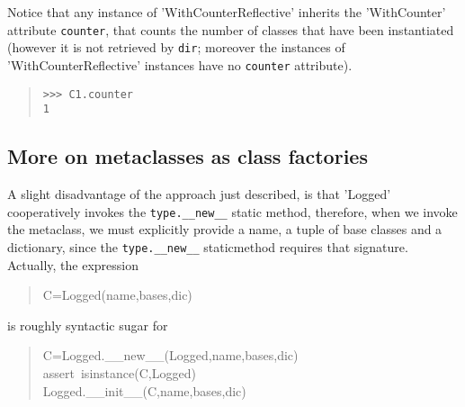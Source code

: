 \documentclass[10pt,english]{article}
\begin{document}
Notice that any instance of 'WithCounterReflective' inherits the 'WithCounter' 
attribute \texttt{counter}, that counts the number of classes that have been 
instantiated (however it is not retrieved by \texttt{dir}; moreover the 
instances of 'WithCounterReflective' instances have no \texttt{counter} attribute).
\begin{quote}
\begin{verbatim}>>> C1.counter
1\end{verbatim}
\end{quote}



\hypertarget{more-on-metaclasses-as-class-factories}{}
\subsection*{More on metaclasses as class factories}

A slight disadvantage of the approach just described, 
is that 'Logged'  cooperatively invokes the \texttt{type.{\_}{\_}new{\_}{\_}} 
static method, therefore, when we invoke the metaclass, we must explicitly 
provide a name, a tuple of base classes and a dictionary, since the 
\texttt{type.{\_}{\_}new{\_}{\_}} staticmethod requires that signature. Actually, 
the expression
\begin{quote}
\begin{ttfamily}\begin{flushleft}
\mbox{C=Logged(name,bases,dic)}
\end{flushleft}\end{ttfamily}
\end{quote}

is roughly syntactic sugar for
\begin{quote}
\begin{ttfamily}\begin{flushleft}
\mbox{C=Logged.{\_}{\_}new{\_}{\_}(Logged,name,bases,dic)~}\\
\mbox{assert~isinstance(C,Logged)}\\
\mbox{Logged.{\_}{\_}init{\_}{\_}(C,name,bases,dic)}
\end{flushleft}\end{ttfamily}
\end{quote}
\end{document}
